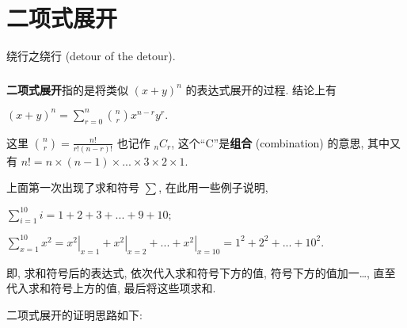 \section{二项式展开}\label{007}

\begin{flushright}{\kaishu 绕行之绕行 (detour of the detour).}\end{flushright}

\begin{tcolorbox}[size=fbox, breakable, enhanced jigsaw, title={二项式展开 (binomial expansion)}]
\hypertarget{ux4e8cux9879ux5f0fux5c55ux5f00-binomial-expansion}{%
\subsubsection{}\label{ux4e8cux9879ux5f0fux5c55ux5f00-binomial-expansion}}

\textbf{二项式展开}指的是将类似 $(x+y)^n$ 的表达式展开的过程. 结论上有

$\boxed{(x+y)^n=\sum_{r=0}^n\binom{n}{r}x^{n-r}y^r}.$

这里 $\binom{n}{r}=\frac{n!}{r!(n-r)!}$ 也记作 $_nC_r$,
这个``C''是\textbf{组合} (combination) 的意思, 其中又有
$n!=n\times(n-1)\times...\times3\times2\times1$.

\begin{newquote}
上面第一次出现了求和符号 $\sum$, 在此用一些例子说明,

$\sum_{i=1}^{10}i=1+2+3+...+9+10;$

$\sum_{x=1}^{10}x^2=\left.x^2\right|_{x=1}+\left.x^2\right|_{x=2}+...+\left.x^2\right|_{x=10}=1^2+2^2+...+10^2.$

即, 求和符号后的表达式, 依次代入求和符号下方的值,
符号下方的值加一\ldots, 直至代入求和符号上方的值, 最后将这些项求和.
\end{newquote}

二项式展开的证明思路如下:
\end{tcolorbox}


